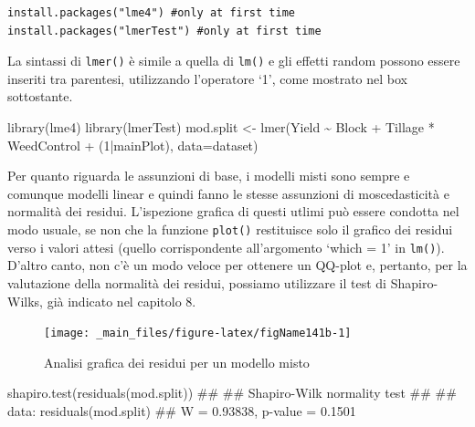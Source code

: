 \documentclass[a4paper,12pt,oneside]{book}
\newenvironment{Shaded}{\begin{snugshade}}{\end{snugshade}}
\newcommand{\DecValTok}[1]{#1}
\newcommand{\SpecialCharTok}[1]{#1}
\newcommand{\DocumentationTok}[1]{#1}
\newcommand{\OtherTok}[1]{#1}
\newcommand{\FunctionTok}[1]{#1}
\newcommand{\AttributeTok}[1]{#1}
\newcommand{\NormalTok}[1]{#1}
\begin{document}
\begin{verbatim}
install.packages("lme4") #only at first time
install.packages("lmerTest") #only at first time
\end{verbatim}

La sintassi di \texttt{lmer()} è simile a quella di \texttt{lm()} e gli effetti random possono essere inseriti tra parentesi, utilizzando l'operatore `1\textbar{}', come mostrato nel box sottostante.

\begin{Shaded}
\begin{Highlighting}[]
\FunctionTok{library}\NormalTok{(lme4)}
\FunctionTok{library}\NormalTok{(lmerTest)}
\NormalTok{mod.split }\OtherTok{\textless{}{-}} \FunctionTok{lmer}\NormalTok{(Yield }\SpecialCharTok{\textasciitilde{}}\NormalTok{ Block }\SpecialCharTok{+}\NormalTok{ Tillage }\SpecialCharTok{*}\NormalTok{ WeedControl }\SpecialCharTok{+}
\NormalTok{                  (}\DecValTok{1}\SpecialCharTok{|}\NormalTok{mainPlot), }\AttributeTok{data=}\NormalTok{dataset)}
\end{Highlighting}
\end{Shaded}

Per quanto riguarda le assunzioni di base, i modelli misti sono sempre e comunque modelli linear e quindi fanno le stesse assunzioni di moscedasticità e normalità dei residui. L'ispezione grafica di questi utlimi può essere condotta nel modo usuale, se non che la funzione \texttt{plot()} restituisce solo il grafico dei residui verso i valori attesi (quello corrispondente all'argomento `which = 1' in \texttt{lm()}). D'altro canto, non c'è un modo veloce per ottenere un QQ-plot e, pertanto, per la valutazione della normalità dei residui, possiamo utilizzare il test di Shapiro-Wilks, già indicato nel capitolo 8.

\begin{figure}

{\centering \texttt{[image: \_main\_files/figure-latex/figName141b-1]} 

}

\caption{Analisi grafica dei residui per un modello misto}\label{fig:figName141b}
\end{figure}

\begin{Shaded}
\begin{Highlighting}[]
\FunctionTok{shapiro.test}\NormalTok{(}\FunctionTok{residuals}\NormalTok{(mod.split))}
\DocumentationTok{\#\# }
\DocumentationTok{\#\#  Shapiro{-}Wilk normality test}
\DocumentationTok{\#\# }
\DocumentationTok{\#\# data:  residuals(mod.split)}
\DocumentationTok{\#\# W = 0.93838, p{-}value = 0.1501}
\end{Highlighting}
\end{Shaded}
\end{document}
